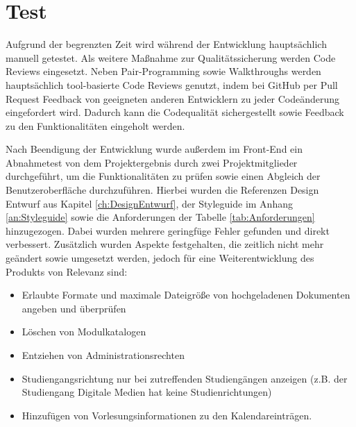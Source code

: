 \section{Test}
\label{ch:Test}
Aufgrund der begrenzten Zeit wird während der Entwicklung hauptsächlich manuell getestet. 
Als weitere Maßnahme zur Qualitätssicherung werden Code Reviews eingesetzt.
Neben Pair-Programming sowie Walkthroughs werden hauptsächlich tool-basierte Code Reviews genutzt, indem bei GitHub per Pull Request Feedback von geeigneten anderen Entwicklern zu jeder Codeänderung eingefordert wird.
Dadurch kann die Codequalität sichergestellt sowie Feedback zu den Funktionalitäten eingeholt werden.

Nach Beendigung der Entwicklung wurde außerdem im Front-End ein Abnahmetest von dem Projektergebnis durch zwei Projektmitglieder durchgeführt, um die Funktionalitäten zu prüfen sowie einen Abgleich der Benutzeroberfläche durchzuführen. 
Hierbei wurden die Referenzen Design Entwurf aus Kapitel \vref{ch:DesignEntwurf}, der Styleguide im Anhang \vref{an:Styleguide} sowie die Anforderungen der Tabelle \vref{tab:Anforderungen} hinzugezogen.
Dabei wurden mehrere geringfüge Fehler gefunden und direkt verbessert.
Zusätzlich wurden Aspekte festgehalten, die zeitlich nicht mehr geändert sowie umgesetzt werden, jedoch für eine Weiterentwicklung des Produkts von Relevanz sind: 

\begin{itemize}
    \item Erlaubte Formate und maximale Dateigröße von hochgeladenen Dokumenten angeben und überprüfen
    \item Löschen von Modulkatalogen 
    \item Entziehen von Administrationsrechten
    \item Studiengangsrichtung nur bei zutreffenden Studiengängen anzeigen (z.B. der Studiengang Digitale Medien hat keine Studienrichtungen)
    \item Hinzufügen von Vorlesungsinformationen zu den Kalendareinträgen.
\end{itemize}
